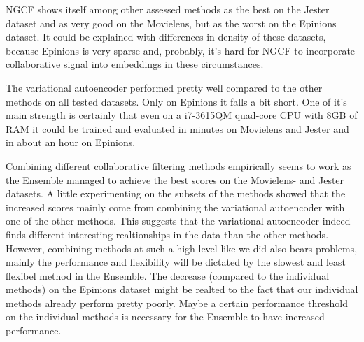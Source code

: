 


NGCF shows itself among other assessed methods as the best on the Jester dataset 
and as very good on the Movielens, but as the worst on the Epinions dataset.
It could be explained with differences in density of these datasets, because
Epinions is very sparse and, probably, it's hard for NGCF to incorporate 
collaborative signal into embeddings in these circumstances.

The variational autoencoder performed pretty well compared to the other methods on all tested datasets. Only on Epinions it falls a bit short. One of it's main strength is certainly that even on a i7-3615QM quad-core CPU with 8GB of RAM it could be trained and evaluated in minutes on Movielens and Jester and in about an hour on Epinions.


Combining different collaborative filtering methods empirically seems to work as the Ensemble managed to achieve the best scores on the Movielens- and Jester datasets. A little experimenting on the subsets of the methods showed that the increased scores mainly come from combining the variational autoencoder with one of the other methods. This suggests that the variational autoencoder indeed finds different interesting realtionships in the data than the other methods. However, combining methods at such a high level like we did also bears problems, mainly the performance and flexibility will be dictated by the slowest and least flexibel method in the Ensemble. The decrease (compared to the individual methods) on the Epinions dataset might be realted to the fact that our individual methods already perform pretty poorly. Maybe a certain performance threshold on the individual methods is necessary for the Ensemble to have increased performance.
